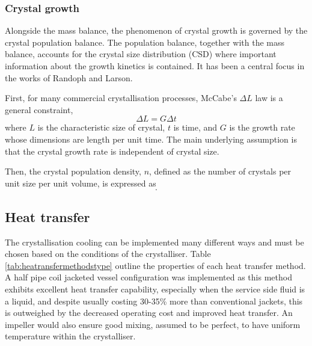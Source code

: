 \subsubsection{Crystal growth}

Alongside the mass balance, the phenomenon of crystal growth is governed by the crystal population balance. The population balance, together with the mass balance, accounts for the crystal size distribution (CSD) where important information about the growth kinetics is contained. It has been a central focus in the works of Randoph and Larson. \cite{randolph_theory_1971}

First, for many commercial crystallisation processes, McCabe's $\Delta L$  law is a general constraint,
\begin{equation} \label{eq: McCabe deltaL}
    \Delta L = G \Delta t
\end{equation}
where $L$ is the characteristic size of crystal, $t$ is time, and $G$ is the growth rate whose dimensions are length per unit time. The main underlying assumption is that the crystal growth rate is independent of crystal size. 

Then, the crystal population density, $n$, defined as the number of crystals per unit size per unit volume, is expressed as 
\begin{equation} \label{eq:crystal population density definition}
    .
\end{equation}






\subsection{Heat transfer}

The crystallisation cooling can be implemented many different ways and must be chosen based on the conditions of the crystalliser. Table \ref{tab:heatransfermethodstype} outline the properties of each heat transfer method. A half pipe coil jacketed vessel configuration was implemented as this method exhibits excellent heat transfer capability, especially when the service side fluid is a liquid, and despite usually costing 30-35\% more than conventional jackets, this is outweighed by the decreased operating cost and improved heat transfer. An impeller would also ensure good mixing, assumed to be perfect, to have uniform temperature within the crystalliser. 

